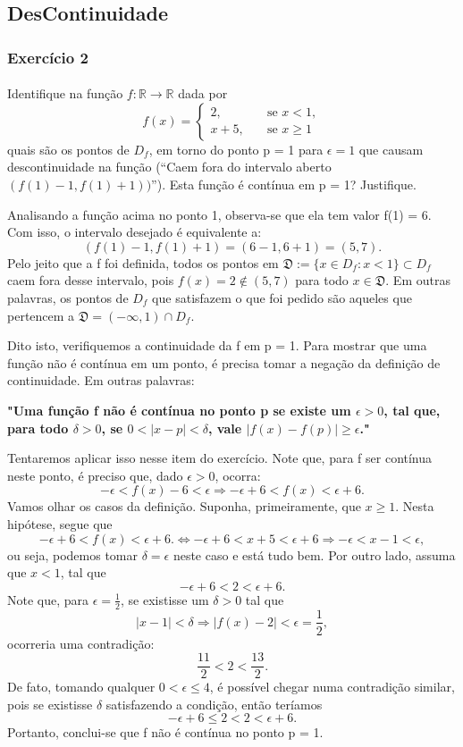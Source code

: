 \documentclass[exercícios_de_cálculo.tex]{subfiles}
\begin{document}
\subsection{DesContinuidade}
\subsubsection{Exercício 2}
\paragraph{} Identifique na função $f:\mathbb{R}\rightarrow\mathbb{R}$ dada por
$$
	f(x) = \left\{\begin{array}{ll}
		2,     & \quad \text{se } x < 1,  \\
		x + 5, & \quad \text{se } x\geq 1
	\end{array}\right.
$$
quais são os pontos de $D_f$, em torno do ponto p = 1 para $\epsilon = 1$ que causam descontinuidade na função (``Caem fora do intervalo aberto $(f(1) - 1, f(1) + 1))$''). Esta funç\~ao é contínua em p = 1? Justifique.
\begin{sol*}
	Analisando a função acima no ponto 1, observa-se que ela tem valor f(1) = 6. Com isso, o intervalo desejado é equivalente a:
	$$
		(f(1) - 1, f(1) + 1) = (6 - 1, 6 + 1) = (5, 7).
	$$
	Pelo jeito que a f foi definida, todos os pontos em $\mathfrak{D}:=\{x\in{D_{f}}: x < 1\} \subset{D_{f}}$ caem fora desse intervalo, pois $f(x) = 2\notin{(5, 7)}$ para todo $x\in\mathfrak{D}.$ Em outras palavras, os pontos de $D_f$ que satisfazem o que foi pedido são aqueles que pertencem a $\mathfrak{D} = (-\infty, 1)\cap{D_{f}}$.

	Dito isto, verifiquemos a continuidade da f em p = 1. Para mostrar que uma função não é contínua em um ponto, é precisa tomar a negaç\~ao da definiç\~ao de continuidade. Em outras palavras:

	\textbf{ "Uma função f não é contínua no ponto p se existe um $\epsilon > 0$, tal que, para todo $\delta > 0$, se $0 < |x - p| < \delta$, vale $|f(x) - f(p)|\geq\epsilon$."}

	Tentaremos aplicar isso nesse item do exercício. Note que, para f ser cont\'inua neste ponto, é preciso que, dado $\epsilon > 0$, ocorra:
	$$
		-\epsilon < f(x) - 6 < \epsilon \Rightarrow -\epsilon + 6 < f(x) < \epsilon + 6.
	$$
	Vamos olhar os casos da definição. Suponha, primeiramente, que $x\geq 1$. Nesta hipótese, segue que
	$$
		-\epsilon + 6 < f(x) < \epsilon + 6. \Leftrightarrow -\epsilon + 6 < x + 5 < \epsilon + 6 \Rightarrow -\epsilon < x - 1 < \epsilon,
	$$
	ou seja, podemos tomar $\delta = \epsilon$ neste caso e está tudo bem. Por outro lado, assuma que $x < 1$, tal que
	$$
		-\epsilon + 6 < 2 < \epsilon + 6.
	$$
	Note que, para $\epsilon = \frac{1}{2}$, se existisse um $\delta > 0$ tal que
	$$
		|x - 1| < \delta \Rightarrow |f(x) - 2| < \epsilon = \frac{1}{2},
	$$
	ocorreria uma contradição:
	$$
		\frac{11}{2} < 2 < \frac{13}{2}.
	$$
	De fato, tomando qualquer $0 < \epsilon \leq 4$, é possível chegar numa contradição similar, pois se existisse $\delta$ satisfazendo a condição, ent\~ao ter\'iamos
	$$
		-\epsilon + 6 \leq 2 < 2 < \epsilon + 6.
	$$
	Portanto, conclui-se que f não é contínua no ponto p = 1.
	\qedsymbol
\end{sol*}
\end{document}
